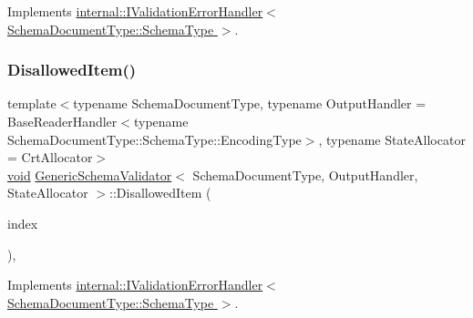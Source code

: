 Implements \hyperlink{classinternal_1_1IValidationErrorHandler_a570a6723282e6c0576a47c492ffe5602}{internal\+::\+I\+Validation\+Error\+Handler$<$ Schema\+Document\+Type\+::\+Schema\+Type $>$}.

\mbox{\label{classGenericSchemaValidator_a2d47a88a3d9fb82466b5bda480b6e70f}} 
\subsubsection{\texorpdfstring{Disallowed\+Item()}{DisallowedItem()}}
{\footnotesize\ttfamily template$<$typename Schema\+Document\+Type, typename Output\+Handler = Base\+Reader\+Handler$<$typename Schema\+Document\+Type\+::\+Schema\+Type\+::\+Encoding\+Type$>$, typename State\+Allocator = Crt\+Allocator$>$ \\
\hyperlink{imgui__impl__opengl3__loader_8h_ac668e7cffd9e2e9cfee428b9b2f34fa7}{void} \hyperlink{classGenericSchemaValidator}{Generic\+Schema\+Validator}$<$ Schema\+Document\+Type, Output\+Handler, State\+Allocator $>$\+::Disallowed\+Item (\begin{DoxyParamCaption}\item[{\hyperlink{rapidjson_8h_a5ed6e6e67250fadbd041127e6386dcb5}{Size\+Type}}]{index }\end{DoxyParamCaption})\hspace{0.3cm}{\ttfamily [inline]}, {\ttfamily [virtual]}}



Implements \hyperlink{classinternal_1_1IValidationErrorHandler_a0ac36d4217d9a14205cbe392601f3ee7}{internal\+::\+I\+Validation\+Error\+Handler$<$ Schema\+Document\+Type\+::\+Schema\+Type $>$}.

\mbox{\label{classGenericSchemaValidator_a44f06b99edfb650c6088f17e8af5b5a8}} 
